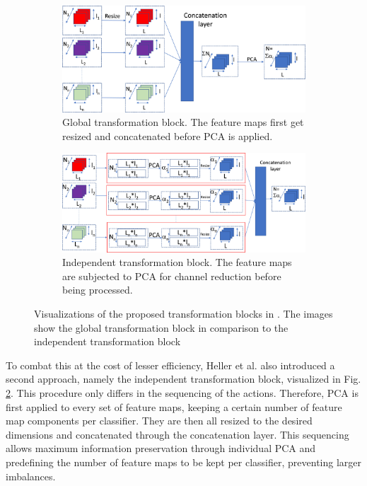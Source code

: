 \begin{figure}[H]
 \captionsetup[subfigure]{justification=centering}
 \centering
\begin{subfigure}[b]{0.4\textwidth} %
 \centering
 \includegraphics[width=\textwidth]{figures/global_transformation_block.jpg}
 \caption{Global transformation block. The feature maps first get resized and concatenated before PCA is applied.}
 \label{fig:GTBheller}
 \end{subfigure}
 \hspace{0.05\textwidth} %
 \begin{subfigure}[b]{0.4\textwidth} %
 \centering
 \includegraphics[width=\textwidth]{figures/independent_transformation_block.jpg}
 \caption{Independent transformation block. The feature maps are subjected to PCA for channel reduction before being processed.}
 \label{fig:ITBheller}
\end{subfigure}
 
 \caption{Visualizations of the proposed transformation blocks in \cite{EnsembleHeller2023}. The images show the global transformation 
block in comparison to the independent transformation block \cite{EnsembleHeller2023}}
 \label{fig:hellerensembleblocks}
\end{figure}




To combat this at the cost of lesser efficiency, Heller et al. also introduced a second approach, namely the independent transformation block, 
visualized in Fig. \ref{fig:ITBheller}. 
This procedure only differs in the sequencing of the actions. Therefore, PCA is first applied to every set of feature maps, keeping 
a certain number of feature map components per classifier. They are then all resized to the desired dimensions and concatenated through 
the concatenation layer. This sequencing allows maximum information preservation through individual PCA and predefining the number 
of feature maps to be kept per classifier, preventing larger imbalances.



